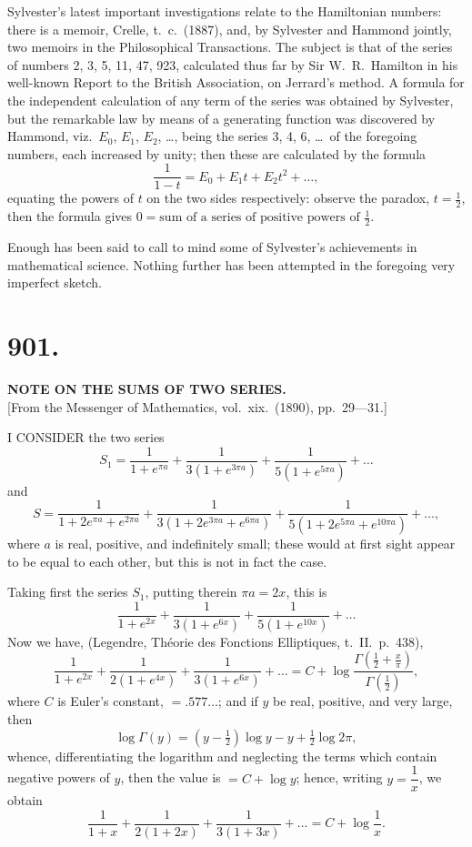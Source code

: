 \documentclass[11pt,a4paper]{article}
\begin{document}
Sylvester's latest important investigations relate to the Hamiltonian numbers: there is a memoir, Crelle, t.\ c.\ (1887), and, by Sylvester and Hammond jointly, two memoirs in the Philosophical Transactions. The subject is that of the series of numbers 2, 3, 5, 11, 47, 923, calculated thus far by Sir W.\ R.\ Hamilton in his well-known Report to the British Association, on Jerrard's method. A formula for the independent calculation of any term of the series was obtained by Sylvester, but the remarkable law by means of a generating function was discovered by Hammond, viz.\ $E_0$, $E_1$, $E_2$, \ldots, being the series 3, 4, 6, \ldots\ of the foregoing numbers, each increased by unity; then these are calculated by the formula
\[
\frac{1}{1-t} = E_0 + E_1t + E_2t^2 + \ldots,
\]
equating the powers of $t$ on the two sides respectively: observe the paradox, $t = \tfrac{1}{2}$, then the formula gives $0 = \text{sum of a series of positive powers of }\tfrac{1}{2}$.

Enough has been said to call to mind some of Sylvester's achievements in mathematical science. Nothing further has been attempted in the foregoing very imperfect sketch.


\section*{901.}
\begin{center}
{\large\bfseries NOTE ON THE SUMS OF TWO SERIES.}\\[0.5em]
\small [From the Messenger of Mathematics, vol.\ xix.\ (1890), pp.\ 29---31.]
\end{center}

I CONSIDER the two series
\[
S_1 = \frac{1}{1+e^{\pi a}} + \frac{1}{3(1+e^{3\pi a})} + \frac{1}{5(1+e^{5\pi a})} + \ldots
\]
and
\[
S = \frac{1}{1+2e^{\pi a}+e^{2\pi a}} + \frac{1}{3(1+2e^{3\pi a}+e^{6\pi a})} + \frac{1}{5(1+2e^{5\pi a}+e^{10\pi a})} + \ldots,
\]
where $a$ is real, positive, and indefinitely small; these would at first sight appear to be equal to each other, but this is not in fact the case.

Taking first the series $S_1$, putting therein $\pi a = 2x$, this is
\[
\frac{1}{1+e^{2x}} + \frac{1}{3(1+e^{6x})} + \frac{1}{5(1+e^{10x})} + \ldots
\]
Now we have, (Legendre, Th\'eorie des Fonctions Elliptiques, t.\ II.\ p.\ 438),
\[
\frac{1}{1+e^{2x}} + \frac{1}{2(1+e^{4x})} + \frac{1}{3(1+e^{6x})} + \ldots = C + \log\frac{\Gamma(\tfrac{1}{2} + \tfrac{x}{\pi})}{\Gamma(\tfrac{1}{2})},
\]
where $C$ is Euler's constant, $= .577\ldots$; and if $y$ be real, positive, and very large, then
\[
\log\Gamma(y) = (y - \tfrac{1}{2})\log y - y + \tfrac{1}{2}\log 2\pi,
\]
whence, differentiating the logarithm and neglecting the terms which contain negative powers of $y$, then the value is $= C + \log y$; hence, writing $y = \dfrac{1}{x}$, we obtain
\[
\frac{1}{1+x} + \frac{1}{2(1+2x)} + \frac{1}{3(1+3x)} + \ldots = C + \log\frac{1}{x}.
\]
\end{document}
